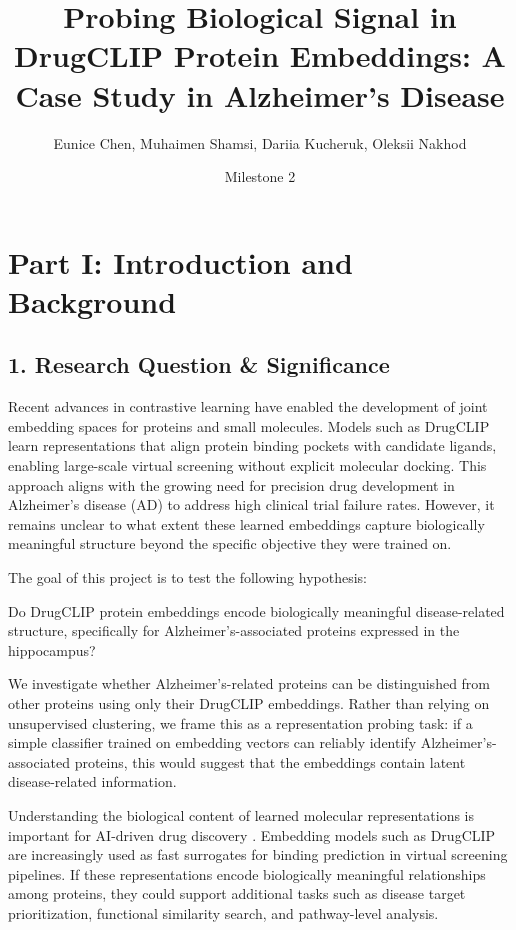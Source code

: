 \documentclass{article}
\title{Probing Biological Signal in DrugCLIP Protein Embeddings: A Case Study in Alzheimer's Disease}
\author{Eunice Chen, Muhaimen Shamsi, Dariia Kucheruk, Oleksii Nakhod}
\date{Milestone 2}
\begin{document}
\maketitle

\section*{Part I: Introduction and Background}

\subsection*{1. Research Question \& Significance}
Recent advances in contrastive learning have enabled the development of joint embedding spaces for proteins and small molecules. Models such as DrugCLIP \cite{adGwas2025,drugclipData2024} learn representations that align protein binding pockets with candidate ligands, enabling large-scale virtual screening without explicit molecular docking. This approach aligns with the growing need for precision drug development in Alzheimer's disease (AD) to address high clinical trial failure rates. However, it remains unclear to what extent these learned embeddings capture biologically meaningful structure beyond the specific objective they were trained on.

The goal of this project is to test the following hypothesis:

Do DrugCLIP protein embeddings encode biologically meaningful disease-related structure, specifically for Alzheimer's-associated proteins expressed in the hippocampus? \cite{adRegion2019,adRegion2022}

We investigate whether Alzheimer's-related proteins can be distinguished from other proteins using only their DrugCLIP embeddings. Rather than relying on unsupervised clustering, we frame this as a representation probing task: if a simple classifier trained on embedding vectors can reliably identify Alzheimer's-associated proteins, this would suggest that the embeddings contain latent disease-related information.

Understanding the biological content of learned molecular representations is important for AI-driven drug discovery \cite{adDrug2025}. Embedding models such as DrugCLIP are increasingly used as fast surrogates for binding prediction \cite{seaadPreprint2025} in virtual screening pipelines. If these representations encode biologically meaningful relationships among proteins, they could support additional tasks such as disease target prioritization, functional similarity search, and pathway-level analysis.
\end{document}
